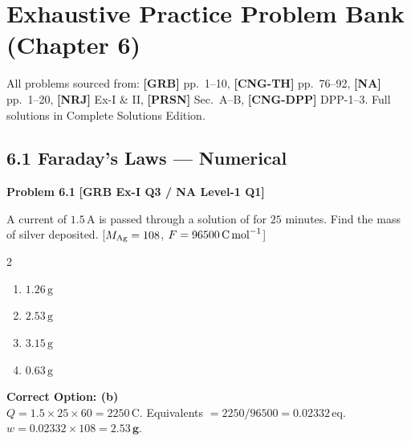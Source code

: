 \newpage
\section{Exhaustive Practice Problem Bank (Chapter 6)}
\label{sec:ch06_problem_bank}

\begin{tcolorbox}[enhanced,colback=subtlegreen,colframe=cengagegreen,arc=2mm,boxrule=1pt,
    title=\textbf{\large Chapter 6 Problem Bank}]
All problems sourced from: \textbf{[GRB]} pp.~1--10, \textbf{[CNG-TH]} pp.~76--92, \textbf{[NA]} pp.~1--20, \textbf{[NRJ]} Ex-I \& II, \textbf{[PRSN]} Sec.~A--B, \textbf{[CNG-DPP]} DPP-1--3. Full solutions in Complete Solutions Edition.
\end{tcolorbox}

\subsection{6.1 Faraday's Laws --- Numerical}

\begin{problembox}
\textbf{Problem 6.1} \hfill \textbf{[GRB Ex-I Q3 / NA Level-1 Q1]}

A current of $1.5\,\text{A}$ is passed through a solution of  for $25$ minutes. Find the mass of silver deposited. [$M_{\ce{Ag}}=108$, $F=96500\,\text{C\,mol}^{-1}$]
\begin{multicols}{2}
\begin{enumerate}[label=(\alph*)]
    \item $1.26\,\text{g}$
    \item $2.53\,\text{g}$
    \item $3.15\,\text{g}$
    \item $0.63\,\text{g}$
\end{enumerate}
\end{multicols}
\end{problembox}
\begin{solution}
\textbf{Correct Option: (b)}\\
$Q = 1.5 \times 25 \times 60 = 2250\,\text{C}$. Equivalents $= 2250/96500 = 0.02332\,\text{eq}$.\\
$w = 0.02332 \times 108 = \mathbf{2.53\,\text{g}}$.
\end{solution}

